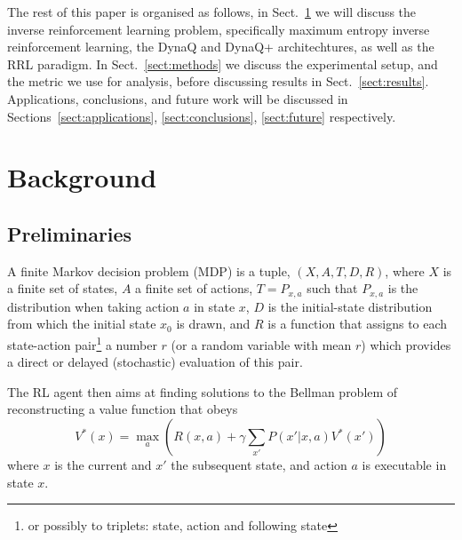 \documentclass[10pt,technote]{IEEEtran}
\begin{document}
The rest of this paper is organised as follows, in Sect.~\ref{sect:background} we will discuss the inverse reinforcement learning problem, specifically maximum entropy inverse reinforcement learning, the DynaQ and DynaQ+ architechtures, as well as the RRL paradigm. In Sect.~\ref{sect:methods} we discuss the experimental setup, and the metric we use for analysis, before discussing results in Sect.~\ref{sect:results}. Applications, conclusions, and future work will be discussed in Sections~\ref{sect:applications}, \ref{sect:conclusions}, \ref{sect:future} respectively.

\section{Background} \label{sect:background}

\subsection{Preliminaries} \label{subsect:prelim}

A finite Markov decision problem (MDP) is a tuple, $(X, A, T, D, R)$, where $X$ is a finite set of states, $A$ a finite set of actions, $T= {P_{x,a}}$ such that $P_{x,a}$ is the distribution when taking action $a$ in state $x$, $D$ is the initial-state distribution from which the initial state $x_0$ is drawn, and $R$ is a function that assigns to each state-action pair\footnote{or possibly to triplets: state, action and following state} a number $r$ (or a random variable with mean $r$) which provides a direct or delayed (stochastic) evaluation of this pair.

The RL agent then aims at finding solutions to the Bellman problem of reconstructing a value function that obeys
\begin{equation}
	V^*(x)=\max_a \left(R(x,a) + \gamma \sum_{x'} P(x'|x,a) V^*(x')\right)
\end{equation} 
where $x$ is the current and $x'$ the subsequent state, and action $a$ is executable in state $x$.
\end{document}
